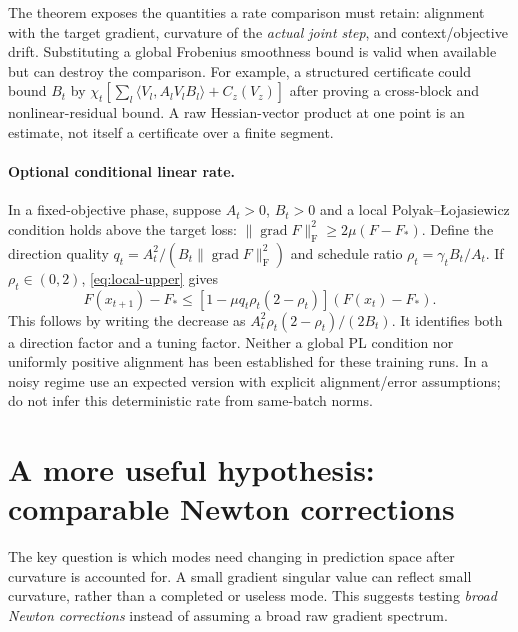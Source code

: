 \documentclass[11pt]{article}
\newcommand{\ip}[2]{\langle #1,#2\rangle}
\newcommand{\F}[1]{\lVert #1\rVert_{\mathrm F}}
\begin{document}
The theorem exposes the quantities a rate comparison must retain:
alignment with the target gradient, curvature of the \emph{actual joint
step}, and context/objective drift. Substituting a global Frobenius
smoothness bound is valid when available but can destroy the comparison.
For example, a structured certificate could bound $B_t$ by
$\chi_t[\sum_l\ip{V_l}{A_lV_lB_l}+C_z(V_z)]$ after proving a
cross-block and nonlinear-residual bound. A raw Hessian-vector product at
one point is an estimate, not itself a certificate over a finite segment.

\paragraph{Optional conditional linear rate.}
In a fixed-objective phase, suppose $A_t>0$, $B_t>0$ and a local
Polyak--\L{}ojasiewicz condition holds above the target loss:
$\F{\operatorname{grad}F}^2\geq2\mu(F-F_*)$.
Define the direction quality $q_t=A_t^2/(B_t\F{\operatorname{grad}F}^2)$
and schedule ratio $\rho_t=\gamma_tB_t/A_t$. If
$\rho_t\in(0,2)$, \eqref{eq:local-upper} gives
\begin{equation}\label{eq:conditional-rate}
 F(x_{t+1})-F_*
 \leq[1-\mu q_t\rho_t(2-\rho_t)](F(x_t)-F_*).
\end{equation}
This follows by writing the decrease as
$A_t^2\rho_t(2-\rho_t)/(2B_t)$. It identifies both a direction factor and
a tuning factor. Neither a global PL condition nor uniformly positive
alignment has been established for these training runs. In a noisy regime
use an expected version with explicit alignment/error assumptions; do not
infer this deterministic rate from same-batch norms.

\section{A more useful hypothesis: comparable Newton corrections}

The key question is which modes need changing in prediction space after
curvature is accounted for. A small gradient singular value can reflect
small curvature, rather than a completed or useless mode. This suggests
testing \emph{broad Newton corrections} instead of assuming a broad raw
gradient spectrum.
\end{document}
